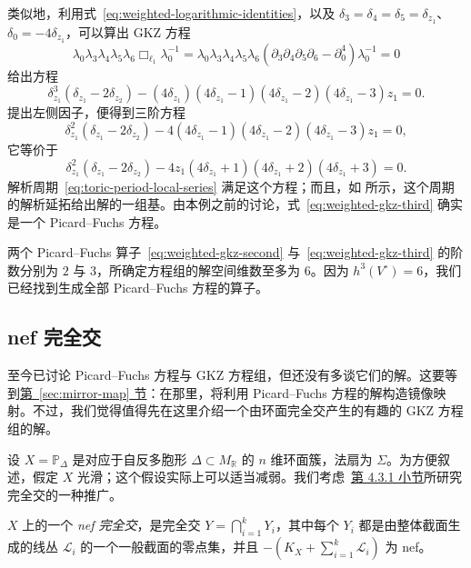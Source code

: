 \begin{example}
类似地，利用式~\eqref{eq:weighted-logarithmic-identities}，以及
$\delta_3=\delta_4=\delta_5=\delta_{z_1}$、$\delta_0=-4\delta_{z_1}$，可以算出 GKZ 方程
\[
\lambda_0\lambda_3\lambda_4\lambda_5\lambda_6\Box_{\ell_1}\lambda_0^{-1}
=\lambda_0\lambda_3\lambda_4\lambda_5\lambda_6
(\partial_3\partial_4\partial_5\partial_6-\partial_0^4)\lambda_0^{-1}=0
\]
给出方程
\[
\delta_{z_1}^3(\delta_{z_1}-2\delta_{z_2})
-(4\delta_{z_1})(4\delta_{z_1}-1)(4\delta_{z_1}-2)(4\delta_{z_1}-3)z_1=0.
\]
提出左侧因子，便得到三阶方程
\[
\delta_{z_1}^2(\delta_{z_1}-2\delta_{z_2})
-4(4\delta_{z_1}-1)(4\delta_{z_1}-2)(4\delta_{z_1}-3)z_1=0,
\]
它等价于
\begin{equation}\label{eq:weighted-gkz-third}
\delta_{z_1}^2(\delta_{z_1}-2\delta_{z_2})
-4z_1(4\delta_{z_1}+1)(4\delta_{z_1}+2)(4\delta_{z_1}+3)=0.
\end{equation}
解析周期~\eqref{eq:toric-period-local-series} 满足这个方程；而且，如  所示，这个周期的解析延拓给出解的一组基。由本例之前的讨论，式~\eqref{eq:weighted-gkz-third} 确实是一个 Picard--Fuchs 方程。

两个 Picard--Fuchs 算子~\eqref{eq:weighted-gkz-second} 与~\eqref{eq:weighted-gkz-third} 的阶数分别为 $2$ 与 $3$，所确定方程组的解空间维数至多为 $6$。因为 $h^3(V^\circ)=6$，我们已经找到生成全部 Picard--Fuchs 方程的算子。
\end{example}

\subsection{nef 完全交}\label{subsec:nef-gkz}

至今已讨论 Picard--Fuchs 方程与 GKZ 方程组，但还没有多谈它们的解。这要等到\hyperref[sec:mirror-map]{第~\ref*{sec:mirror-map} 节}：在那里，将利用 Picard--Fuchs 方程的解构造镜像映射。不过，我们觉得值得先在这里介绍一个由环面完全交产生的有趣的 GKZ 方程组的解。

设 $X=\mathbb P_\Delta$ 是对应于自反多胞形 $\Delta\subset M_{\mathbb R}$ 的 $n$ 维环面簇，法扇为 $\Sigma$。为方便叙述，假定 $X$ 光滑；这个假设实际上可以适当减弱。我们考虑~\hyperref[subsec:nef-partitions]{第 4.3.1 小节}所研究完全交的一种推广。
\begin{definition}\label{def:nef-complete-intersection}
$X$ 上的一个 \emph{nef 完全交}，是完全交 $Y=\bigcap_{i=1}^kY_i$，其中每个 $Y_i$ 都是由整体截面生成的线丛 $\mathcal L_i$ 的一个一般截面的零点集，并且 $-(K_X+\sum_{i=1}^k\mathcal L_i)$ 为 nef。
\end{definition}

